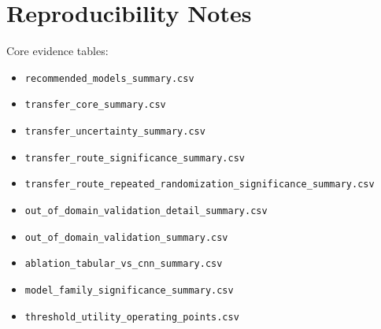 \documentclass[11pt]{article}
\begin{document}
\section{Reproducibility Notes}
Core evidence tables:
\begin{itemize}
\item \texttt{recommended\_models\_summary.csv}
\item \texttt{transfer\_core\_summary.csv}
\item \texttt{transfer\_uncertainty\_summary.csv}
\item \texttt{transfer\_route\_significance\_summary.csv}
\item \texttt{transfer\_route\_repeated\_randomization\_significance\_summary.csv}
\item \texttt{out\_of\_domain\_validation\_detail\_summary.csv}
\item \texttt{out\_of\_domain\_validation\_summary.csv}
\item \texttt{ablation\_tabular\_vs\_cnn\_summary.csv}
\item \texttt{model\_family\_significance\_summary.csv}
\item \texttt{threshold\_utility\_operating\_points.csv}
\end{itemize}
\end{document}
